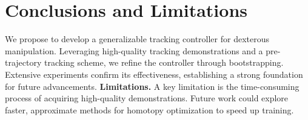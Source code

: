 \section{Conclusions and Limitations}


\vspace{-5pt}

We propose \modelname to develop a generalizable tracking controller for dexterous manipulation. Leveraging high-quality tracking demonstrations and a pre-trajectory tracking scheme, we refine the controller through bootstrapping. Extensive experiments confirm its effectiveness, establishing a strong foundation for future advancements. \noindent\textbf{Limitations.} A key limitation is the time-consuming process of acquiring high-quality demonstrations. Future work could explore faster, approximate methods for homotopy optimization to speed up training.




